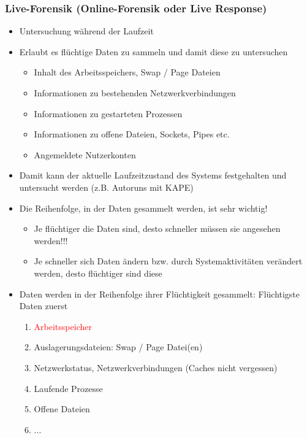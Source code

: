 \subsubsection{Live-Forensik (Online-Forensik oder Live Response)}
\begin{itemize}
    \item Untersuchung während der Laufzeit
    \item Erlaubt es flüchtige Daten zu sammeln und damit diese zu untersuchen
    \begin{itemize}
        \item Inhalt des Arbeitsspeichers, Swap / Page Dateien
        \item Informationen zu bestehenden Netzwerkverbindungen
        \item Informationen zu gestarteten Prozessen
        \item Informationen zu offene Dateien, Sockets, Pipes etc.
        \item Angemeldete Nutzerkonten
    \end{itemize}
    \item Damit kann der aktuelle Laufzeitzustand des Systems festgehalten und untersucht werden (z.B. Autoruns mit KAPE)
    \item Die Reihenfolge, in der Daten gesammelt werden, ist sehr wichtig!
    \begin{itemize}
        \item Je flüchtiger die Daten sind, desto schneller müssen sie angesehen werden!!!
        \item Je schneller sich Daten ändern bzw. durch Systemaktivitäten verändert werden, desto flüchtiger sind diese
    \end{itemize}
    \item Daten werden in der Reihenfolge ihrer Flüchtigkeit gesammelt: Flüchtigste Daten zuerst
    \begin{enumerate}
        \item \textcolor{red}{Arbeitsspeicher}
        \item \glqq Auslagerungsdateien\grqq{}: Swap / Page Datei(en)
        \item Netzwerkstatus, Netzwerkverbindungen (Caches nicht vergessen)
        \item Laufende Prozesse
        \item Offene Dateien
        \item ...
    \end{enumerate}
\end{itemize}

